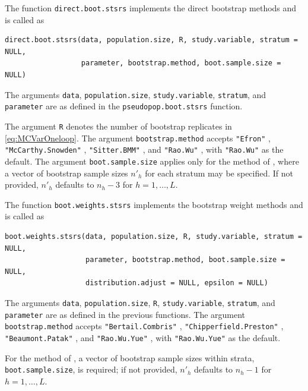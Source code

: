 The function \texttt{direct.boot.stsrs} implements the direct bootstrap methods and is called as

\begin{verbatim}
direct.boot.stsrs(data, population.size, R, study.variable, stratum = NULL,
                  parameter, bootstrap.method, boot.sample.size = NULL)
\end{verbatim}

The arguments \texttt{data}, \texttt{population.size}, \texttt{study.variable}, \texttt{stratum}, and \texttt{parameter} are as defined in the \texttt{pseudopop.boot.stsrs} function.

The argument \texttt{R} denotes the number of bootstrap replicates in \eqref{eq:MCVarOneloop}. The argument \texttt{bootstrap.method} accepts \texttt{"Efron"} \citep{Efron:1979}, \texttt{"McCarthy.Snowden"} \citep{McCarthy:Snowden:1985}, \texttt{"Sitter.BMM"} \citep{Sitter:1992b}, and \texttt{"Rao.Wu"} \citep{Rao:Wu:1988}, with \texttt{"Rao.Wu"} as the default. The argument \texttt{boot.sample.size} applies only for the method of \citet{Rao:Wu:1988}, where a vector of bootstrap sample sizes \(n'_h\) for each stratum may be specified. If not provided, \(n'_h\) defaults to \(n_h - 3\) for \(h = 1, \ldots, L\).

The function \texttt{boot.weights.stsrs} implements the bootstrap weight methods and is called as

\begin{verbatim}
boot.weights.stsrs(data, population.size, R, study.variable, stratum = NULL,
                   parameter, bootstrap.method, boot.sample.size = NULL,
                   distribution.adjust = NULL, epsilon = NULL)
\end{verbatim}

The arguments \texttt{data}, \texttt{population.size}, \texttt{R}, \texttt{study.variable}, \texttt{stratum}, and \texttt{parameter} are as defined in the previous functions. The argument \texttt{bootstrap.method} accepts \texttt{"Bertail.Combris"} \citep{Bertail:Combris:1997}, \texttt{"Chipperfield.Preston"} \citep{Chipperfield:Preston:2007}, \texttt{"Beaumont.Patak"} \citep{Beaumont:Patak:2012}, and \texttt{"Rao.Wu.Yue"} \citep{Rao:Wu:Yue:1992}, with \texttt{"Rao.Wu.Yue"} as the default.

For the method of \citet{Rao:Wu:Yue:1992}, a vector of bootstrap sample sizes within strata, \texttt{boot.sample.size}, is required; if not provided, \(n'_h\) defaults to \(n_h - 1\) for \(h = 1, \ldots, L\).

